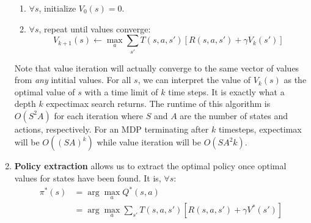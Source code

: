 \documentclass[10pt]{article}
\begin{document}
\begin{multicols}{2}
\begin{addmargin}[0.8em]{0.5em}
\begin{enumerate}[label=(\alph*)]
\begin{enumerate}[label=\roman*.]
                \item $\forall s$, initialize $V_0(s)=0$.
                \item $\forall s$, repeat until values converge:
                $$V_{k+1}(s) \leftarrow \max_{a}\sum_{s'} T(s,a,s') [R(s,a,s')+\gamma V_k(s')]$$
            \end{enumerate}
            Note that value iteration will actually converge to the same vector of values from \textit{any} intitial values.
            For all $s$, we can interpret the value of $V_{k}(s)$ as the optimal value of $s$ with a time limit of $k$ time steps. It is exactly what a depth $k$ expectimax search returns. The runtime of this algorithm is $O(S^2A)$ for each iteration where $S$ and $A$ are the number of states and actions, respectively. For an MDP terminating after $k$ timesteps, expectimax will be $O((SA)^k)$ while value iteration will be $O(SA^2k)$.
            \item \textbf{Policy extraction} allows us to extract the optimal policy once optimal values for states have been found. It is, $\forall s$:
            \begin{align*}
\pi^*(s)&=\arg\max_{a} Q^*(s,a) \\ &=\arg\max_a \sum_{s'} T(s,a,s') [R(s,a,s')+\gamma V^*(s')]
            \end{align*}
        

\end{enumerate}
\end{addmargin}
\end{multicols}
\end{document}
